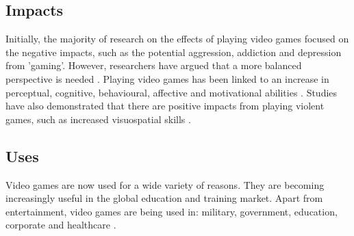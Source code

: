 \documentclass[a4paper,11.5pt]{report}
\numberwithin{figure}{section}
\numberwithin{table}{section}
\numberwithin{equation}{section}
\numberwithin{equation}{section}
\begin{document}
\subsection{Impacts}


Initially, the majority of research on the effects of playing video games focused on the negative impacts, such as the potential aggression, addiction and depression from 'gaming'. However, researchers have argued that a more balanced perspective is needed \citep{Granic2014}. Playing video games has been linked to an increase in perceptual, cognitive, behavioural, affective and motivational abilities \citep{Connolly2012}. Studies have also demonstrated that there are positive impacts from playing violent games, such as increased visuospatial skills \citep{Ferguson2007}. 

\subsection{Uses}

Video games are now used for a wide variety of reasons. They are becoming increasingly useful in the global education and training market. Apart from entertainment, video games are being used in: military, government, education, corporate and healthcare \citep{Johann2015}.




\end{document}

